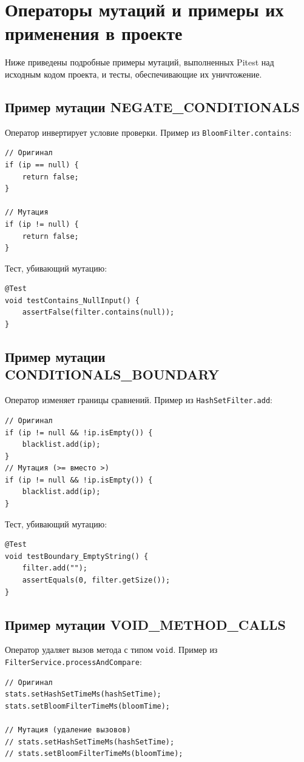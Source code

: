 \section{Операторы мутаций и примеры их применения в проекте} \label{ch4:sec1b}

Ниже приведены подробные примеры мутаций, выполненных Pitest над исходным кодом проекта, и тесты, обеспечивающие их уничтожение.

\subsection{Пример мутации NEGATE\_CONDITIONALS}
Оператор инвертирует условие проверки. Пример из \texttt{BloomFilter.contains}:
\begin{verbatim}
// Оригинал
if (ip == null) {
    return false;
}

// Мутация
if (ip != null) {
    return false;
}
\end{verbatim}

Тест, убивающий мутацию:
\begin{verbatim}
@Test
void testContains_NullInput() {
    assertFalse(filter.contains(null));
}
\end{verbatim}

\subsection{Пример мутации CONDITIONALS\_BOUNDARY}
Оператор изменяет границы сравнений. Пример из \texttt{HashSetFilter.add}:
\begin{verbatim}
// Оригинал
if (ip != null && !ip.isEmpty()) {
    blacklist.add(ip);
}
// Мутация (>= вместо >)
if (ip != null && !ip.isEmpty()) {
    blacklist.add(ip);
}
\end{verbatim}

Тест, убивающий мутацию:
\begin{verbatim}
@Test
void testBoundary_EmptyString() {
    filter.add("");
    assertEquals(0, filter.getSize());
}
\end{verbatim}

\subsection{Пример мутации VOID\_METHOD\_CALLS}
Оператор удаляет вызов метода с типом \texttt{void}. Пример из \texttt{FilterService.processAndCompare}:
\begin{verbatim}
// Оригинал
stats.setHashSetTimeMs(hashSetTime);
stats.setBloomFilterTimeMs(bloomTime);

// Мутация (удаление вызовов)
// stats.setHashSetTimeMs(hashSetTime);
// stats.setBloomFilterTimeMs(bloomTime);
\end{verbatim}

